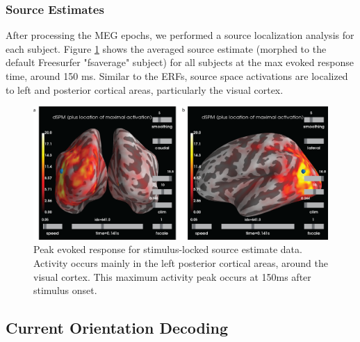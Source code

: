 \documentclass[../main.tex]{subfiles}
\begin{document}
\subsubsection*{Source Estimates}
After processing the MEG epochs, we performed a source localization analysis for each subject. Figure \ref{source_max} shows the averaged source estimate (morphed to the default Freesurfer "fsaverage" subject) for all subjects at the max evoked response time, around 150 ms. Similar to the ERFs, source space activations are localized to left and posterior cortical areas, particularly the visual cortex.

\begin{figure}
    \centering
    \includegraphics[scale=0.7]{figures/results/source_localiztion_results.png}
    \caption{Peak evoked response for stimulus-locked source estimate data. Activity occurs mainly in the left posterior cortical areas, around the visual cortex. This maximum activity peak occurs at 150ms after stimulus onset.}
    \label{source_max}
\end{figure}


\subsection*{Current Orientation Decoding}
\end{document}
